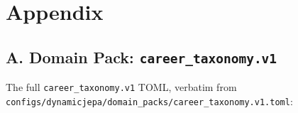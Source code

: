 \documentclass[10pt,twocolumn,letterpaper]{article}
\newcommand{\code}[1]{\texttt{\small #1}}
\begin{document}



\appendix
\onecolumn
\section*{Appendix}

\subsection*{A. Domain Pack: \texttt{career\_taxonomy.v1}}
\label{app:domainpack}

The full \code{career\_taxonomy.v1} TOML, verbatim from
\code{configs/dynamicjepa/domain\_packs/career\_taxonomy.v1.toml}:
\end{document}
